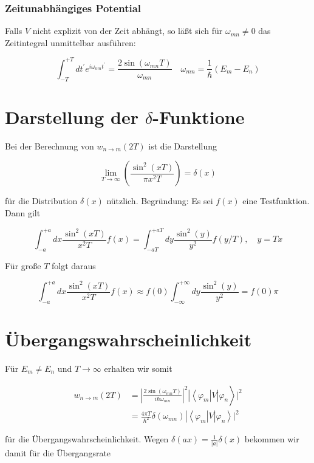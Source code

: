 \documentclass[10pt, letterpaper]{article}
\begin{document}
\subsubsection*{Zeitunabhängiges Potential}
Falls $V$ nicht explizit von der Zeit abhängt, so läßt sich für $\omega_{m n} \neq 0$ das Zeitintegral unmittelbar ausführen:

$$
\int_{-T}^{+T} d t^{\prime} e^{i \omega_{n m} t^{\prime}}=\frac{2 \sin \left(\omega_{m n} T\right)}{\omega_{m n}} \quad \omega_{m n}=\frac{1}{\hbar}\left(E_{m}-E_{n}\right)
$$

\section*{Darstellung der $\delta$-Funktione}
Bei der Berechnung von $w_{n \rightarrow m}(2 T)$ ist die Darstellung

$$
\lim _{T \rightarrow \infty}\left(\frac{\sin ^{2}(x T)}{\pi x^{2} T}\right)=\delta(x)
$$

für die Distribution $\delta(x)$ nützlich. Begründung: Es sei $f(x)$ eine Testfunktion. Dann gilt

$$
\int_{-a}^{+a} d x \frac{\sin ^{2}(x T)}{x^{2} T} f(x)=\int_{-a T}^{+a T} d y \frac{\sin ^{2}(y)}{y^{2}} f(y / T), \quad y=T x
$$

Für große $T$ folgt daraus

$$
\int_{-a}^{+a} d x \frac{\sin ^{2}(x T)}{x^{2} T} f(x) \approx f(0) \int_{-\infty}^{+\infty} d y \frac{\sin ^{2}(y)}{y^{2}}=f(0) \pi
$$

\section*{Übergangswahrscheinlichkeit}
Für $E_{m} \neq E_{n}$ und $T \rightarrow \infty$ erhalten wir somit

$$
\begin{aligned}
w_{n \rightarrow m}(2 T) & \left.=\left|\frac{2 \sin \left(\omega_{m n} T\right)}{i \hbar \omega_{m n}}\right|^{2}\left|\left\langle\varphi_{m}\right| V\right| \varphi_{n}\right\rangle\left.\right|^{2} \\
& \left.=\frac{4 \pi T}{\hbar^{2}} \delta\left(\omega_{m n}\right)\left|\left\langle\varphi_{m}\right| V\right| \varphi_{n}\right\rangle\left.\right|^{2}
\end{aligned}
$$

für die Übergangswahrscheinlichkeit. Wegen $\delta(a x)=\frac{1}{|a|} \delta(x)$ bekommen wir damit für die Übergangsrate
\end{document}

